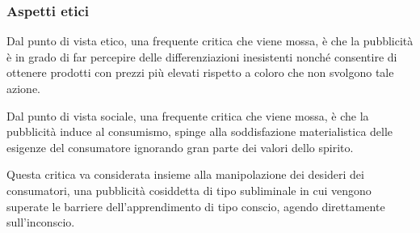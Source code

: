 \subsubsection{Aspetti etici}
Dal punto di vista etico, una frequente critica che viene mossa, è che la pubblicità è in grado di far percepire delle differenziazioni inesistenti nonché consentire di ottenere prodotti con prezzi più elevati rispetto a coloro che non svolgono tale azione.

Dal punto di vista sociale, una frequente critica che viene mossa, è che la pubblicità induce al consumismo, spinge alla soddisfazione materialistica delle esigenze del consumatore ignorando gran parte dei valori dello spirito.

Questa critica va considerata insieme alla manipolazione dei desideri dei consumatori, una pubblicità cosiddetta di tipo subliminale
in cui vengono superate le barriere dell'apprendimento di tipo conscio, agendo direttamente sull'inconscio.

